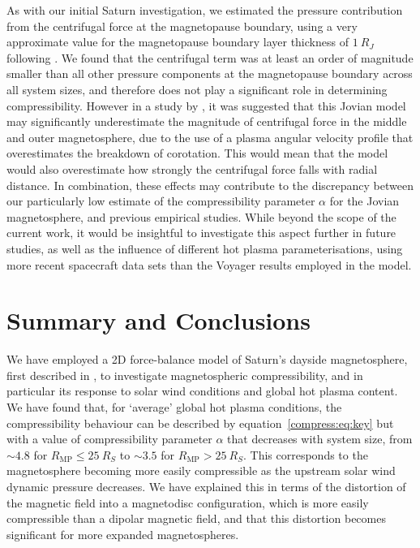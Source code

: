 As with our initial Saturn investigation, we estimated the pressure contribution from the centrifugal force at the magnetopause boundary, using a very approximate value for the magnetopause boundary layer thickness of $\SI{1}{R_J}$ following \citet{delamere2010}. We found that the centrifugal term was at least an order of magnitude smaller than all other pressure components at the magnetopause boundary across all system sizes, and therefore does not play a significant role in determining compressibility. However in a study by \citet{nichols2011}, it was suggested that this Jovian model may significantly underestimate the magnitude of centrifugal force in the middle and outer magnetosphere, due to the use of a plasma angular velocity profile that overestimates the breakdown of corotation. This would mean that the model would also overestimate how strongly the centrifugal force falls with radial distance. In combination, these effects may contribute to the discrepancy between our particularly low estimate of the compressibility parameter $\alpha$ for the Jovian magnetosphere, and previous empirical studies. While beyond the scope of the  current work,  it  would be insightful to investigate this aspect further in future studies, as well as the influence of different hot plasma parameterisations, using more recent spacecraft data sets than the Voyager results employed in the \citet{caudal1986} model.

\section{Summary and Conclusions}
We have employed a 2D force-balance model of Saturn's dayside magnetosphere, first described in \citet{achilleos2010a}, to investigate magnetospheric compressibility, and in particular its response to solar wind conditions and global hot plasma content. We have found that, for `average' global hot plasma conditions, the compressibility behaviour can be described by equation~\ref{compress:eq:key} but with a value of compressibility parameter $\alpha$ that decreases with system size, from ${\sim}4.8$ for $R_\mathrm{MP} \leq \SI{25}{R_S}$ to ${\sim}3.5$ for $R_\mathrm{MP} > \SI{25}{R_S}$. This corresponds to the magnetosphere becoming more easily compressible as the upstream solar wind dynamic pressure decreases. We have explained this in terms of the distortion of the magnetic field into a magnetodisc configuration, which is more easily compressible than a dipolar magnetic field, and that this distortion becomes significant for more expanded magnetospheres. 


